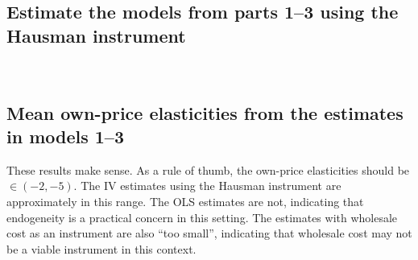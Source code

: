 \documentclass[dvipsnames]{article}
\begin{document}
  \subsection*{Estimate the models from parts 1--3 using the Hausman instrument}

\begin{table}
  \centering
  
  \end{table}
  \newpage

\begin{table}
  \centering
  
  \end{table}

\begin{table}
  \centering
  
  \end{table}
  \\

\newpage
\subsection*{Mean own-price elasticities from the estimates in models 1--3}

\begin{table}
  \centering
  
  \end{table}

These results make sense. As a rule of thumb, the own-price elasticities should be $\in (-2, -5)$. The IV estimates using the Hausman instrument are approximately in this range. The OLS estimates are not, indicating that endogeneity is a practical concern in this setting. The estimates with wholesale cost as an instrument are also ``too small'', indicating that wholesale cost may not be a viable instrument in this context.



  
\end{document}

